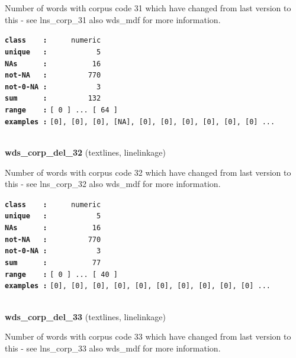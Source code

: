 \documentclass[]{article}
\begin{document}
Number of words with corpus code 31 which have changed from last version
to this - see lns\_corp\_31 also wds\_mdf for more information.

\textbf{\texttt{class\ \ \ \ :}} \texttt{~~~~~numeric}\\
\textbf{\texttt{unique\ \ \ :}} \texttt{~~~~~~~~~~~5}\\
\textbf{\texttt{NAs\ \ \ \ \ \ :}} \texttt{~~~~~~~~~~16}\\
\textbf{\texttt{not-NA\ \ \ :}} \texttt{~~~~~~~~~770}\\
\textbf{\texttt{not-0-NA\ :}} \texttt{~~~~~~~~~~~3}\\
\textbf{\texttt{sum\ \ \ \ \ \ :}} \texttt{~~~~~~~~~132}\\
\textbf{\texttt{range\ \ \ \ :}}
\texttt{{[}\ 0\ {]}\ ...\ {[}\ 64\ {]}}\\
\textbf{\texttt{examples\ :}}
\texttt{{[}0{]},\ {[}0{]},\ {[}0{]},\ {[}NA{]},\ {[}0{]},\ {[}0{]},\ {[}0{]},\ {[}0{]},\ {[}0{]},\ {[}0{]}\ ...}\\

~

\textbf{wds\_corp\_del\_32} (textlines, linelinkage)

Number of words with corpus code 32 which have changed from last version
to this - see lns\_corp\_32 also wds\_mdf for more information.

\textbf{\texttt{class\ \ \ \ :}} \texttt{~~~~~numeric}\\
\textbf{\texttt{unique\ \ \ :}} \texttt{~~~~~~~~~~~5}\\
\textbf{\texttt{NAs\ \ \ \ \ \ :}} \texttt{~~~~~~~~~~16}\\
\textbf{\texttt{not-NA\ \ \ :}} \texttt{~~~~~~~~~770}\\
\textbf{\texttt{not-0-NA\ :}} \texttt{~~~~~~~~~~~3}\\
\textbf{\texttt{sum\ \ \ \ \ \ :}} \texttt{~~~~~~~~~~77}\\
\textbf{\texttt{range\ \ \ \ :}}
\texttt{{[}\ 0\ {]}\ ...\ {[}\ 40\ {]}}\\
\textbf{\texttt{examples\ :}}
\texttt{{[}0{]},\ {[}0{]},\ {[}0{]},\ {[}0{]},\ {[}0{]},\ {[}0{]},\ {[}0{]},\ {[}0{]},\ {[}0{]},\ {[}0{]}\ ...}\\

~

\textbf{wds\_corp\_del\_33} (textlines, linelinkage)

Number of words with corpus code 33 which have changed from last version
to this - see lns\_corp\_33 also wds\_mdf for more information.
\end{document}
